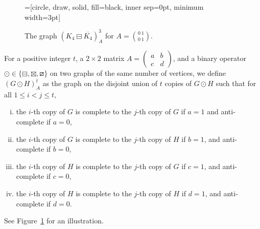 \documentclass[11pt]{article}
\newcommand\mat{\boxminus}
\newcommand\tri{\boxslash}
\newcommand\antimat{\boxtimes}
\def\S_#1{\overline{K_{#1}}}
\begin{document}
\begin{figure}
  \centering
  =[circle, draw, solid, fill=black, inner sep=0pt, minimum width=3pt]
  \caption{The graph $(K_4\mat \S_4)^3_A$ for $A=
      \binom{0 ~ 1}{0~1}
      $.}
  \label{fig:construction2}
\end{figure}
For a positive integer $t$,
a $2\times 2$ matrix $A=(\begin{smallmatrix}a&b\\c&d\end{smallmatrix})$,
and a binary operator $\odot \in \{\mat, \antimat, \tri\}$ on two graphs of the same number of vertices,
we define $(G\odot H)^t _A$
as the graph on the disjoint union of $t$ copies of $G\odot H$
such that for all $1\le i<j\le t$,
\begin{enumerate}[(i)]
\item the $i$-th copy of $G$ is complete to
  the $j$-th copy of $G$ if $a=1$
  and anti-complete if $a=0$, 
\item the $i$-th copy of $G$ is complete to
  the $j$-th copy of $H$ if $b=1$,
  and anti-complete if $b=0$, 
\item the $i$-th copy of $H$ is complete to
  the $j$-th copy of $G$ if  $c=1$,
  and anti-complete if $c=0$, 
\item the $i$-th copy of $H$ is complete to
  the $j$-th copy of $H$ if  $d=1$,
  and anti-complete if $d=0$.
\end{enumerate}
See Figure~\ref{fig:construction2} for an illustration.
\end{document}
